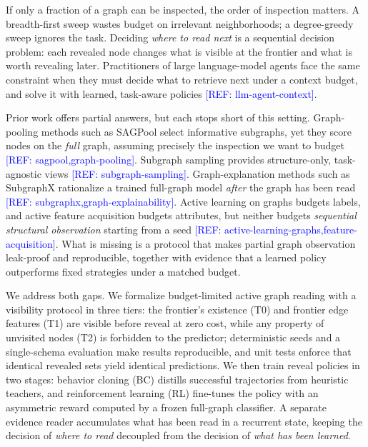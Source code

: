 \documentclass{article}
\newcommand{\refadd}[1]{\textcolor{blue}{[REF: #1]}}
\begin{document}
If only a fraction of a graph can be inspected, the order of inspection matters. A breadth-first sweep wastes budget on irrelevant neighborhoods; a degree-greedy sweep ignores the task. Deciding \emph{where to read next} is a sequential decision problem: each revealed node changes what is visible at the frontier and what is worth revealing later. Practitioners of large language-model agents face the same constraint when they must decide what to retrieve next under a context budget, and solve it with learned, task-aware policies \refadd{llm-agent-context}.

Prior work offers partial answers, but each stops short of this setting. Graph-pooling methods such as SAGPool select informative subgraphs, yet they score nodes on the \emph{full} graph, assuming precisely the inspection we want to budget \refadd{sagpool,graph-pooling}. Subgraph sampling provides structure-only, task-agnostic views \refadd{subgraph-sampling}. Graph-explanation methods such as SubgraphX rationalize a trained full-graph model \emph{after} the graph has been read \refadd{subgraphx,graph-explainability}. Active learning on graphs budgets labels, and active feature acquisition budgets attributes, but neither budgets \emph{sequential structural observation} starting from a seed \refadd{active-learning-graphs,feature-acquisition}. What is missing is a protocol that makes partial graph observation leak-proof and reproducible, together with evidence that a learned policy outperforms fixed strategies under a matched budget.

We address both gaps. We formalize budget-limited active graph reading with a visibility protocol in three tiers: the frontier's existence (T0) and frontier edge features (T1) are visible before reveal at zero cost, while any property of unvisited nodes (T2) is forbidden to the predictor; deterministic seeds and a single-schema evaluation make results reproducible, and unit tests enforce that identical revealed sets yield identical predictions. We then train reveal policies in two stages: behavior cloning (BC) distills successful trajectories from heuristic teachers, and reinforcement learning (RL) fine-tunes the policy with an asymmetric reward computed by a frozen full-graph classifier. A separate evidence reader accumulates what has been read in a recurrent state, keeping the decision of \emph{where to read} decoupled from the decision of \emph{what has been learned}.
\end{document}
